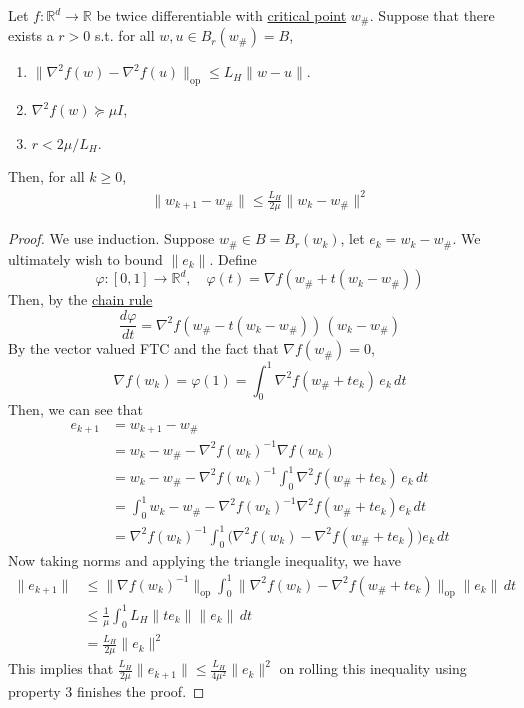 	\begin{theorem}
	  \label{thm:quadratic-convergence}
		Let $f: \mathbb{R}^d \to \mathbb{R}$ be twice differentiable with \hyperref[real-def:critical-point]{critical point} $w_{\#}$. Suppose that there exists a $r > 0$ s.t. for all $w, u \in B_r (w_{\#}) = B$, 
		\begin{enumerate}
			\item $\|\nabla^2 f(w) - \nabla^2 f(u) \|_{\mathrm{op}} \leq L_H \|w - u\|$. 
			\item $\nabla^2 f(w) \succeq \mu I$, 
			\item $r < 2\mu/L_H$. 
		\end{enumerate}
		Then, for all $k \geq 0$, 
		\begin{align}
			\|w_{k+1} - w_{\#}\| \leq \frac{L_H}{2 \mu} \|w_k - w_{\#} \|^2
		\end{align}
	\end{theorem}
	\begin{proof}
		We use induction. Suppose $w_{\#} \in B = B_r (w_k)$, let $e_k = w_k - w_{\#}$. We ultimately wish to bound $\|e_k\|$. Define 
		\begin{equation}
			\varphi: [0, 1] \to \mathbb{R}^d, \quad \varphi(t) = \nabla f(w_{\#} + t(w_k - w_{\#})) 
		\end{equation}
		Then, by the \hyperref[mv-thm:chain-rule]{chain rule}
		\begin{equation}
			\frac{d \varphi}{d t} = \nabla^2 f(w_{\#} - t(w_k - w_{\#}) ) \, (w_k - w_{\#}) 
		\end{equation}
		By the vector valued FTC and the fact that $\nabla f(w_{\#}) = 0$, 
		\begin{equation}
			\nabla f(w_k) = \varphi(1) = \int_0^1 \nabla^2 f(w_{\#} + te_k) \, e_k \,dt 
		\end{equation}
		Then, we can see that 
		\begin{align}
			e_{k+1} & = w_{k+1} - w_{\#} \\ 
							& = w_{k} - w_{\#} - \nabla^2 f(w_k)^{-1} \nabla f(w_k) \\ 
							& = w_k - w_{\#} - \nabla^2 f(w_k)^{-1} \int_0^1 \nabla^2 f(w_{\#} + te_k) \, e_k \,dt \\ 
							& = \int_0^1 w_k - w_{\#} - \nabla^2 f(w_k)^{-1} \nabla^2 f(w_{\#} + t e_k) e_k \,dt \\ 
							& = \nabla^2 f(w_k)^{-1} \int_0^1 \big( \nabla^2 f(w_k) - \nabla^2 f(w_{\#} + t e_k) \big) e_k \,dt
		\end{align}
		Now taking norms and applying the triangle inequality, we have 
		\begin{align}
			\|e_{k+1}\| & \leq \|\nabla f(w_k)^{-1}\|_{\mathrm{op}} \int_0^1 \|\nabla^2 f(w_k) - \nabla^2 f(w_{\#} + t e_k)\|_{\mathrm{op}} \|e_k\| \,dt \\ 
									& \leq \frac{1}{\mu} \int_0^1 L_H \|t e_k\| \|e_k\| \,dt \\ 
									& = \frac{L_H}{2 \mu} \|e_k\|^2
		\end{align}
		This implies that $\frac{L_H}{2 \mu} \|e_{k+1}\| \leq \frac{L_H}{4 \mu^2} \|e_k\|^2$ on rolling this inequality using property 3 finishes the proof. 
	\end{proof}	

